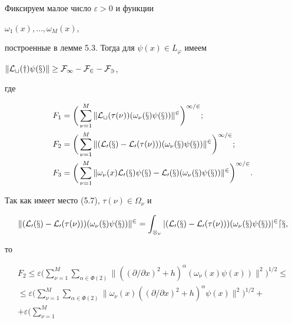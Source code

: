 \begin{pf}
 


Фиксируем малое число $\varepsilon>0$ и функции 


$\omega_1(x),\dotsc,\omega_M(x)$, 


построенные в лемме 5.3. Тогда для $\psi(x)\in L_\varphi$ имеем 


$\|\cal L_t(y)\psi(x)\|\ge F_1-F_2-F_3$, 


где 


\begin{align*} 


F_1&=\bigg(\sum^M_{\nu=1}\|\cal L_t(\tau(\nu))(\omega_\nu(x)\psi(x) 


)\|^2\bigg)^{1/2};\\ 


F_2&=\bigg(\sum^M_{\nu=1}\|(\cal L_0(x)-\cal L_0(\tau(\nu))) 


(\omega_\nu(x)\psi(x))\|^2\bigg)^{1/2};\\ 


F_3&=\bigg(\sum^M_{\nu=1}\|\omega_\nu(x)\cal L_0(x)\psi(x) 


-\cal L_0(x)(\omega_\nu(x)\psi(x))\|^2\bigg)^{1/2}. 


\end{align*} 


Так как имеет место (5.7), $\tau(\nu)\in\Omega_\nu$ и 


$$ 


\|(\cal L_0(x)-\cal L_0(\tau(\nu))) 


(\omega_\nu(x)\psi(x))\|^2=\int_{\Omega_\nu} 


|(\cal L_0(x)-\cal L_0(\tau(\nu))) 


(\omega_\nu(x)\psi(x))|^2dx, 


$$ 


то 


\begin{multline*} 


F_2\le\varepsilon\bigg(\sum^M_{\nu=1} 


\sum_{\alpha\in\Phi(2)}\|((\partial/\partial x)^2+ 


h)^\alpha(\omega_\nu(x)\psi(x))\|^2\bigg)^{1/2}\le \\ 


\le\varepsilon\bigg(\sum^M_{\nu=1} 


\sum_{\alpha\in\Phi(2)}\|\omega_\nu(x) 


((\partial/\partial x)^2+h)^\alpha\psi(x)\|^2\bigg)^{1/2}+ \\ 


+\varepsilon\bigg(\sum^M_{\nu=1} 



\end{multline*}
\end{pf}
